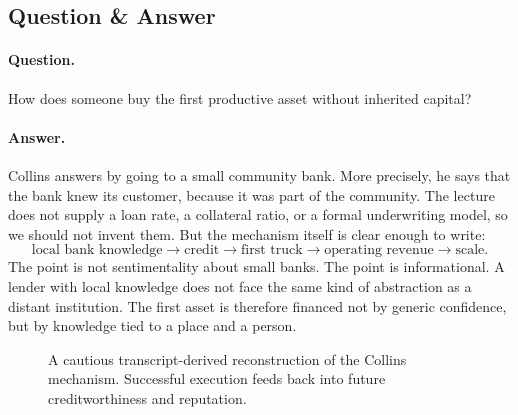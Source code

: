 \subsection{Question \& Answer}

\paragraph{Question.} How does someone buy the first productive asset without inherited capital?

\paragraph{Answer.} Collins answers by going to a small community bank. More precisely, he says that the bank knew its customer, because it was part of the community. The lecture does not supply a loan rate, a collateral ratio, or a formal underwriting model, so we should not invent them. But the mechanism itself is clear enough to write:
\begin{equation}
\text{local bank knowledge}\to \text{credit}\to \text{first truck}\to \text{operating revenue}\to \text{scale}.
\end{equation}
The point is not sentimentality about small banks. The point is informational. A lender with local knowledge does not face the same kind of abstraction as a distant institution. The first asset is therefore financed not by generic confidence, but by knowledge tied to a place and a person.

\begin{figure}[h]
\centering
{}
\caption{A cautious transcript-derived reconstruction of the Collins mechanism. Successful execution feeds back into future creditworthiness and reputation.}
\end{figure}

